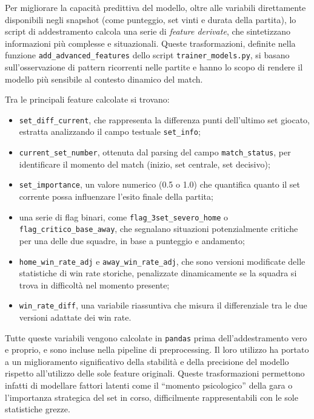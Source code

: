 \documentclass[a4paper,12pt]{report}
\begin{document}
Per migliorare la capacità predittiva del modello, oltre alle variabili direttamente disponibili negli snapshot (come punteggio, set vinti e durata della partita), lo script di addestramento calcola una serie di \textit{feature derivate}, che sintetizzano informazioni più complesse e situazionali. Queste trasformazioni, definite nella funzione \texttt{add\_advanced\_features} dello script \texttt{trainer\_models.py}, si basano sull’osservazione di pattern ricorrenti nelle partite e hanno lo scopo di rendere il modello più sensibile al contesto dinamico del match.

Tra le principali feature calcolate si trovano:
\begin{itemize}
  \item \texttt{set\_diff\_current}, che rappresenta la differenza punti dell’ultimo set giocato, estratta analizzando il campo testuale \texttt{set\_info};
  \item \texttt{current\_set\_number}, ottenuta dal parsing del campo \texttt{match\_status}, per identificare il momento del match (inizio, set centrale, set decisivo);
  \item \texttt{set\_importance}, un valore numerico (0.5 o 1.0) che quantifica quanto il set corrente possa influenzare l’esito finale della partita;
  \item una serie di flag binari, come \texttt{flag\_3set\_severo\_home} o \texttt{flag\_critico\_base\_away}, che segnalano situazioni potenzialmente critiche per una delle due squadre, in base a punteggio e andamento;
  \item \texttt{home\_win\_rate\_adj} e \texttt{away\_win\_rate\_adj}, che sono versioni modificate delle statistiche di win rate storiche, penalizzate dinamicamente se la squadra si trova in difficoltà nel momento presente;
  \item \texttt{win\_rate\_diff}, una variabile riassuntiva che misura il differenziale tra le due versioni adattate dei win rate.
\end{itemize}

Tutte queste variabili vengono calcolate in \texttt{pandas} prima dell’addestramento vero e proprio, e sono incluse nella pipeline di preprocessing. Il loro utilizzo ha portato a un miglioramento significativo della stabilità e della precisione del modello rispetto all’utilizzo delle sole feature originali. Queste trasformazioni permettono infatti di modellare fattori latenti come il “momento psicologico” della gara o l’importanza strategica del set in corso, difficilmente rappresentabili con le sole statistiche grezze.
\end{document}
